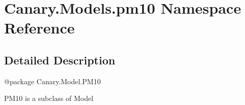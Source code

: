 \hypertarget{namespace_canary_1_1_models_1_1pm10}{\section{Canary.\-Models.\-pm10 Namespace Reference}
\label{namespace_canary_1_1_models_1_1pm10}
}


\subsection{Detailed Description}
\begin{DoxyVerb}@package Canary.Model.PM10

PM10 is a subclass of Model
\end{DoxyVerb}
 